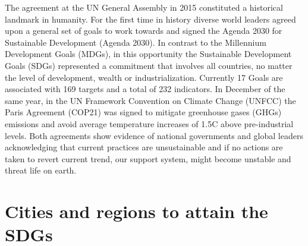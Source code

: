 The agreement at the UN General Assembly in 2015 constituted a historical landmark in humanity. For the first time in history diverse world leaders agreed upon a general set of goals to work towards and signed the Agenda 2030 for Sustainable Development (Agenda 2030). In contrast to the Millennium Development Goals (MDGs), in this opportunity the Sustainable Development Goals (SDGs) represented a commitment that involves all countries, no matter the level of development, wealth or industrialization.  Currently 17 Goals are associated with 169 targets and a total of 232 indicators. In December of the same year, in the UN Framework Convention on Climate Change (UNFCC) the Paris Agreement (COP21) was signed to mitigate greenhouse gases (GHGs) emissions and avoid average temperature increases of 1.5C above pre-industrial levels. Both agreements show evidence of national governments and global leaders acknowledging that current practices are unsustainable and if no actions are taken to revert current trend, our support system, might become unstable and threat life on earth.\par


\section{Cities and regions to attain the SDGs}

